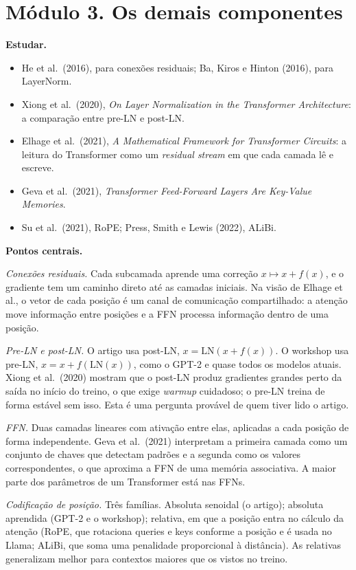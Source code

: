 \documentclass[
  11pt,
]{article}
\providecommand{\tightlist}{%
  \setlength{\itemsep}{0pt}\setlength{\parskip}{0pt}}
\begin{document}
\section{Módulo 3. Os demais
componentes}\label{muxf3dulo-3.-os-demais-componentes}

\textbf{Estudar.}

\begin{itemize}
\tightlist
\item
  He et al.~(2016), para conexões residuais; Ba, Kiros e Hinton (2016),
  para LayerNorm.
\item
  Xiong et al.~(2020), \emph{On Layer Normalization in the Transformer
  Architecture}: a comparação entre pre-LN e post-LN.
\item
  Elhage et al.~(2021), \emph{A Mathematical Framework for Transformer
  Circuits}: a leitura do Transformer como um \emph{residual stream} em
  que cada camada lê e escreve.
\item
  Geva et al.~(2021), \emph{Transformer Feed-Forward Layers Are
  Key-Value Memories}.
\item
  Su et al.~(2021), RoPE; Press, Smith e Lewis (2022), ALiBi.
\end{itemize}

\textbf{Pontos centrais.}

\emph{Conexões residuais.} Cada subcamada aprende uma correção
\(x \mapsto x + f(x)\), e o gradiente tem um caminho direto até as
camadas iniciais. Na visão de Elhage et al., o vetor de cada posição é
um canal de comunicação compartilhado: a atenção move informação entre
posições e a FFN processa informação dentro de uma posição.

\emph{Pre-LN e post-LN.} O artigo usa post-LN,
\(x = \text{LN}(x + f(x))\). O workshop usa pre-LN,
\(x = x + f(\text{LN}(x))\), como o GPT-2 e quase todos os modelos
atuais. Xiong et al.~(2020) mostram que o post-LN produz gradientes
grandes perto da saída no início do treino, o que exige \emph{warmup}
cuidadoso; o pre-LN treina de forma estável sem isso. Esta é uma
pergunta provável de quem tiver lido o artigo.

\emph{FFN.} Duas camadas lineares com ativação entre elas, aplicadas a
cada posição de forma independente. Geva et al.~(2021) interpretam a
primeira camada como um conjunto de chaves que detectam padrões e a
segunda como os valores correspondentes, o que aproxima a FFN de uma
memória associativa. A maior parte dos parâmetros de um Transformer está
nas FFNs.

\emph{Codificação de posição.} Três famílias. Absoluta senoidal (o
artigo); absoluta aprendida (GPT-2 e o workshop); relativa, em que a
posição entra no cálculo da atenção (RoPE, que rotaciona queries e keys
conforme a posição e é usada no Llama; ALiBi, que soma uma penalidade
proporcional à distância). As relativas generalizam melhor para
contextos maiores que os vistos no treino.
\end{document}
